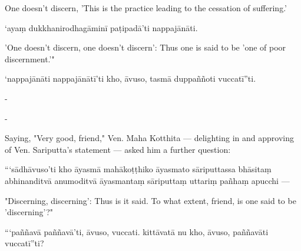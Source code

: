 \begin{samepage}
\begin{leftcolumn*}
One doesn't discern, 'This is the practice leading to the cessation of suffering.'
\end{leftcolumn*}

\begin{rightcolumn}
‘ayaṃ dukkhanirodhagāminī paṭipadā’ti nappajānāti.
\end{rightcolumn}
\end{samepage}

\begin{samepage}
\begin{leftcolumn*}
'One doesn't discern, one doesn't discern': Thus one is said to be 'one of poor discernment.'"
\end{leftcolumn*}

\begin{rightcolumn}
‘nappajānāti nappajānātī’ti kho, āvuso, tasmā duppaññoti vuccatī”ti.
\end{rightcolumn}
\end{samepage}

\begin{samepage}
\begin{leftcolumn*}
-
\end{leftcolumn*}

\begin{rightcolumn}
-
\end{rightcolumn}
\end{samepage}

\begin{samepage}
\begin{leftcolumn*}
Saying, "Very good, friend," Ven. Maha Kotthita — delighting in and approving of Ven. Sariputta's statement — asked him a further question:
\end{leftcolumn*}

\begin{rightcolumn}
“‘sādhāvuso’ti kho āyasmā mahākoṭṭhiko āyasmato sāriputtassa bhāsitaṃ abhinanditvā anumoditvā āyasmantaṃ sāriputtaṃ uttariṃ pañhaṃ apucchi —
\end{rightcolumn}
\end{samepage}

\begin{samepage}
\begin{leftcolumn*}
"Discerning, discerning': Thus is it said. To what extent, friend, is one said to be 'discerning'?"
\end{leftcolumn*}

\begin{rightcolumn}
“‘paññavā paññavā’ti, āvuso, vuccati. kittāvatā nu kho, āvuso, paññavāti vuccatī”ti?
\end{rightcolumn}
\end{samepage}

